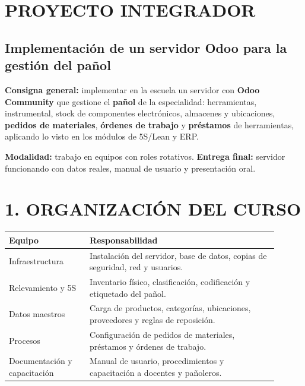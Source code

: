\clearpage
\section*{PROYECTO INTEGRADOR}
\subsection*{Implementación de un servidor Odoo para la gestión del pañol}

\begin{recuadro}
\textbf{Consigna general:} implementar en la escuela un servidor con \textbf{Odoo Community} que
gestione el \textbf{pañol} de la especialidad: herramientas, instrumental, stock de componentes
electrónicos, almacenes y ubicaciones, \textbf{pedidos de materiales}, \textbf{órdenes de
trabajo} y \textbf{préstamos} de herramientas, aplicando lo visto en los módulos de 5S/Lean y
ERP.

\textbf{Modalidad:} trabajo en equipos con roles rotativos. \textbf{Entrega final:} servidor
funcionando con datos reales, manual de usuario y presentación oral.
\end{recuadro}

\section*{1. ORGANIZACIÓN DEL CURSO}

\begin{center}
\small
\begin{tabular}{|p{0.27\linewidth}|p{0.63\linewidth}|}
\hline
\textbf{Equipo} & \textbf{Responsabilidad} \\ \hline
Infraestructura & Instalación del servidor, base de datos, copias de seguridad, red y usuarios. \\ \hline
Relevamiento y 5S & Inventario físico, clasificación, codificación y etiquetado del pañol. \\ \hline
Datos maestros & Carga de productos, categorías, ubicaciones, proveedores y reglas de
reposición. \\ \hline
Procesos & Configuración de pedidos de materiales, préstamos y órdenes de trabajo. \\ \hline
Documentación y capacitación & Manual de usuario, procedimientos y capacitación a docentes y
pañoleros. \\ \hline
\end{tabular}
\end{center}

